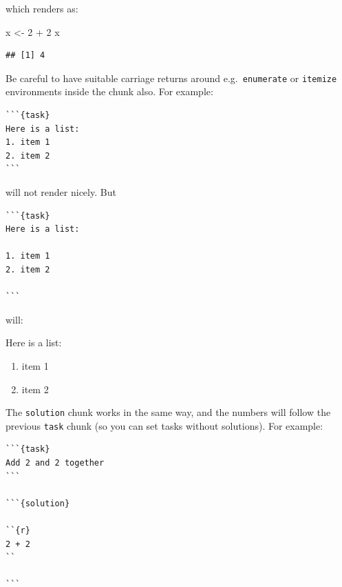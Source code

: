 \documentclass[
  british,
  oneside]{krantz}
\newenvironment{Shaded}{\begin{snugshade}}{\end{snugshade}}
\newcommand{\DecValTok}[1]{\textcolor[rgb]{0.00,0.00,0.81}{#1}}
\newcommand{\NormalTok}[1]{#1}
\newcommand{\OtherTok}[1]{\textcolor[rgb]{0.56,0.35,0.01}{#1}}
\newcommand{\SpecialCharTok}[1]{\textcolor[rgb]{0.00,0.00,0.00}{#1}}
\providecommand{\tightlist}{%
  \setlength{\itemsep}{0pt}\setlength{\parskip}{0pt}}
\newcommand{\bblockT}[2][Task]{\begin{tcolorbox}[title = #1 #2, parbox = false]}
\newcommand{\eblockT}{\end{tcolorbox}}
\theoremstyle{definition}
\theoremstyle{definition}
\theoremstyle{definition}
\theoremstyle{definition}
\theoremstyle{remark}
\begin{document}
which renders as:

\hypertarget{tsk2}{}\bblockT[Task]{\phantomsection\label{sol2}2}

\begin{Shaded}
\begin{Highlighting}[]
\NormalTok{x }\OtherTok{\textless{}{-}} \DecValTok{2} \SpecialCharTok{+} \DecValTok{2}
\NormalTok{x}
\end{Highlighting}
\end{Shaded}

\begin{verbatim}
## [1] 4
\end{verbatim}

\eblockT

Be careful to have suitable carriage returns around e.g.~\texttt{enumerate} or \texttt{itemize} environments inside the chunk also. For example:

\begin{verbatim}
```{task}
Here is a list:
1. item 1
2. item 2
```
\end{verbatim}

will not render nicely. But

\begin{verbatim}
```{task}
Here is a list:

1. item 1
2. item 2

```
\end{verbatim}

will:

\hypertarget{tsk3}{}\bblockT[Task]{\phantomsection\label{sol3}3}

Here is a list:

\begin{enumerate}
\def\labelenumi{\arabic{enumi}.}
\tightlist
\item
  item 1
\item
  item 2
\end{enumerate}

\eblockT

The \texttt{solution} chunk works in the same way, and the numbers will follow the previous \texttt{task} chunk (so you can set tasks without solutions). For example:

\begin{verbatim}
```{task}
Add 2 and 2 together
```

```{solution}

``{r}
2 + 2
``

```
\end{verbatim}
\end{document}
